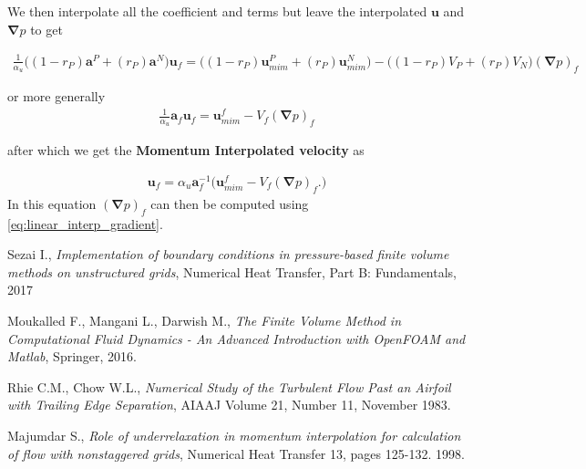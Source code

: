 \documentclass[11pt,letterpaper,titlepage]{article}
\newcommand{\beqn}{\begin{equation}
	\begin{aligned}}
\newcommand{\eeqn}{\end{aligned}
	\end{equation}}
\newcommand{\bnabla}{\boldsymbol{\nabla}}
\newcommand{\bvel}{\mathbf{u}}
\numberwithin{equation}{section}
\begin{document}
We then interpolate all the coefficient and terms but leave the interpolated $\bvel$ and $\bnabla p$ to get

\beqn
\frac{1}{\alpha_u} \biggr(
(1-r_P)\mathbf{a}^P + (r_P)\mathbf{a}^N
\biggr ) \bvel_f  
= \biggr(
(1-r_P)\bvel_{mim}^P + (r_P)\bvel_{mim}^N
\biggr )
-\biggr(
(1-r_P)V_P + (r_P)V_N
\biggr ) (\bnabla p)_f
\eeqn 

or more generally
\beqn
\frac{1}{\alpha_u} \mathbf{a}_f \bvel_f  
= \bvel_{mim}^f
-V_f (\bnabla p)_f
\eeqn 

after which we get the \textbf{Momentum Interpolated velocity} as

\beqn \label{eq:MIM_velocity}
 \bvel_f  
= \alpha_u \mathbf{a}_f^{-1} \biggr(
\bvel_{mim}^f
-V_f (\bnabla p)_f.
\biggr)
\eeqn 
\newline
In this equation $(\bnabla p)_f$ can then be computed using \eqref{eq:linear_interp_gradient}.



\newpage
{}
\begin{thebibliography}{1}
    
     Sezai I., {\em Implementation of boundary conditions in pressure-based finite volume methods on unstructured grids}, Numerical Heat Transfer, Part B: Fundamentals, 2017
    
     Moukalled F., Mangani L., Darwish M., {\em The Finite Volume Method in Computational Fluid Dynamics - An Advanced Introduction with OpenFOAM and Matlab}, Springer, 2016.
    
     Rhie C.M., Chow W.L., {\em Numerical Study of the Turbulent Flow Past an Airfoil with Trailing Edge Separation}, AIAAJ Volume 21, Number 11, November 1983.
    
     Majumdar S., {\em Role of underrelaxation in momentum interpolation for calculation of flow with nonstaggered grids}, Numerical Heat Transfer 13, pages 125-132. 1998.
    
    
\end{thebibliography}
\end{document}

